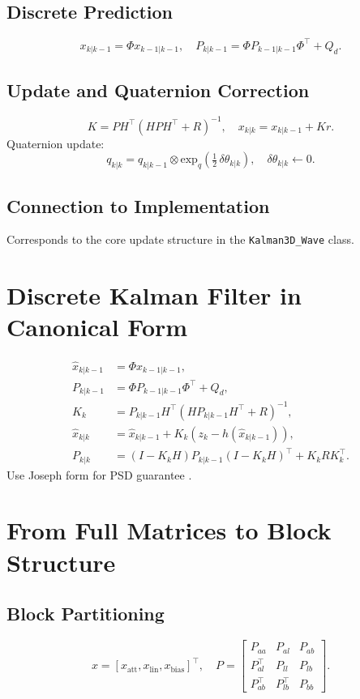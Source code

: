 \documentclass[10pt]{extarticle}
\begin{document}
\subsection{Discrete Prediction}
\[
x_{k|k-1} = \Phi x_{k-1|k-1},\quad
P_{k|k-1} = \Phi P_{k-1|k-1}\Phi^\top + Q_d.
\]

\subsection{Update and Quaternion Correction}
\[
K = P H^\top(HPH^\top+R)^{-1},\quad
x_{k|k}=x_{k|k-1}+K r.
\]
Quaternion update:
\[
q_{k|k}=q_{k|k-1}\otimes
\mathrm{exp}_q\!\left(\tfrac12\,\delta\theta_{k|k}\right),\quad
\delta\theta_{k|k}\!\leftarrow0.
\]
\cite{markley2003,crassidis2012}

\subsection{Connection to Implementation}
Corresponds to the core update structure in the \texttt{Kalman3D\_Wave} class.

\section{Discrete Kalman Filter in Canonical Form}
\label{sec:canonical}
\smallskip
\[
\begin{aligned}
\hat x_{k|k-1}&=\Phi\hat x_{k-1|k-1},\\
P_{k|k-1}&=\Phi P_{k-1|k-1}\Phi^\top+Q_d,\\
K_k&=P_{k|k-1}H^\top(HP_{k|k-1}H^\top+R)^{-1},\\
\hat x_{k|k}&=\hat x_{k|k-1}+K_k(z_k-h(\hat x_{k|k-1})),\\
P_{k|k}&=(I-K_kH)P_{k|k-1}(I-K_kH)^\top+K_kRK_k^\top.
\end{aligned}
\]
Use Joseph form for PSD guarantee
\cite{maybeck1979,crassidis2012}.

\section{From Full Matrices to Block Structure}
\label{sec:block}

\subsection{Block Partitioning}
\[
x=[x_\text{att},x_\text{lin},x_\text{bias}]^\top,\quad
P=\begin{bmatrix}
P_{aa}&P_{al}&P_{ab}\\
P_{al}^\top&P_{ll}&P_{lb}\\
P_{ab}^\top&P_{lb}^\top&P_{bb}
\end{bmatrix}.
\]
\end{document}
